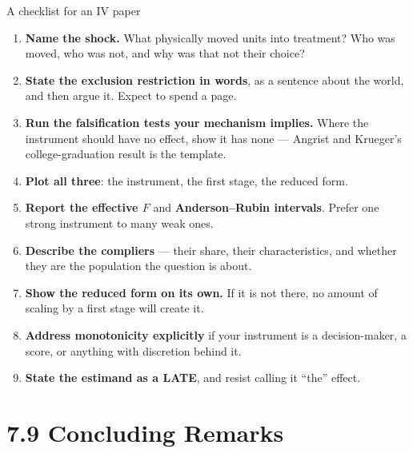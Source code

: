 \documentclass[
  11pt,
  ignorenonframetext,
  aspectratio=169,
]{beamer}
\newcounter{none} %
\providecommand{\tightlist}{%
  \setlength{\itemsep}{0pt}\setlength{\parskip}{0pt}}
\begin{document}
\begin{frame}{A checklist for an IV paper}
\protect{}\label{a-checklist-for-an-iv-paper}
\small

\begin{enumerate}
\tightlist
\item
  \textbf{Name the shock.} What physically moved units into treatment?
  Who was moved, who was not, and why was that not their choice?
\item
  \textbf{State the exclusion restriction in words}, as a sentence about
  the world, and then argue it. Expect to spend a page.
\item
  \textbf{Run the falsification tests your mechanism implies.} Where the
  instrument should have no effect, show it has none --- Angrist and
  Krueger's college-graduation result is the template.
\item
  \textbf{Plot all three}: the instrument, the first stage, the reduced
  form.
\item
  \textbf{Report the effective \(F\)} and \textbf{Anderson--Rubin
  intervals}. Prefer one strong instrument to many weak ones.
\item
  \textbf{Describe the compliers} --- their share, their
  characteristics, and whether they are the population the question is
  about.
\item
  \textbf{Show the reduced form on its own.} If it is not there, no
  amount of scaling by a first stage will create it.
\item
  \textbf{Address monotonicity explicitly} if your instrument is a
  decision-maker, a score, or anything with discretion behind it.
\item
  \textbf{State the estimand as a LATE}, and resist calling it ``the''
  effect.
\end{enumerate}
\end{frame}

\section{7.9 Concluding Remarks}\label{concluding-remarks}
\end{document}
